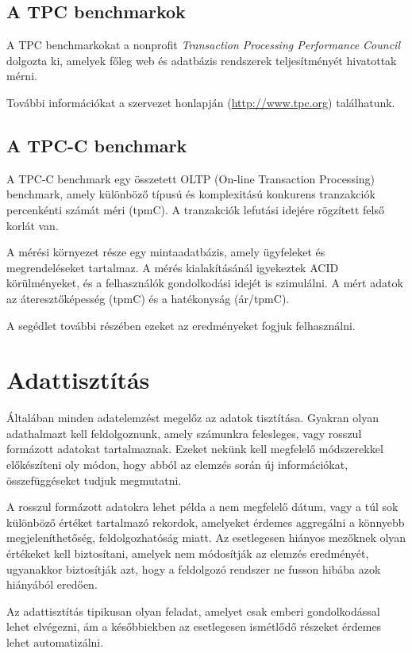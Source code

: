 \documentclass[a4paper,10pt,titlepage]{article}
\begin{document}
\subsection{A TPC benchmarkok}
A TPC benchmarkokat a nonprofit \textit{Transaction Processing Performance Council} dolgozta ki, amelyek főleg web és adatbázis rendszerek teljesítményét hivatottak mérni.

További információkat a szervezet honlapján (\url{http://www.tpc.org}) találhatunk.

\subsection{A TPC-C benchmark}
A TPC-C benchmark egy összetett OLTP (On-line Transaction Processing) benchmark, amely különböző típusú és komplexitású konkurens tranzakciók percenkénti számát méri (tpmC). A tranzakciók lefutási idejére rögzített felső korlát van.

A mérési környezet része egy mintaadatbázis, amely ügyfeleket és megrendeléseket tartalmaz. A mérés kialakításánál igyekeztek ACID körülményeket, és a felhasználók gondolkodási idejét is szimulálni. A mért adatok az áteresztőképesség (tpmC) és a hatékonyság (ár/tpmC). 

A segédlet további részében ezeket az eredményeket fogjuk felhasználni.
 
\section{Adattisztítás}

Általában minden adatelemzést megelőz az adatok tisztítása. Gyakran olyan adathalmazt kell feldolgoznunk, amely számunkra felesleges, vagy rosszul formázott adatokat tartalmaznak. Ezeket nekünk kell megfelelő módszerekkel előkészíteni oly módon, hogy abból az elemzés során új információkat, összefüggéseket tudjuk megmutatni.

A rosszul formázott adatokra lehet példa a nem megfelelő dátum, vagy a túl sok különböző értéket tartalmazó rekordok, amelyeket érdemes aggregálni a könnyebb megjeleníthetőség, feldolgozhatóság miatt. Az esetlegesen hiányos mezőknek olyan értékeket kell biztosítani, amelyek nem módosítják az elemzés eredményét, ugyanakkor biztosítják azt, hogy a feldolgozó rendszer ne fusson hibába azok hiányából eredően.

Az adattisztítás tipikusan olyan feladat, amelyet csak emberi gondolkodással lehet elvégezni, ám a későbbiekben az esetlegesen ismétlődő részeket érdemes lehet automatizálni.
\end{document}
